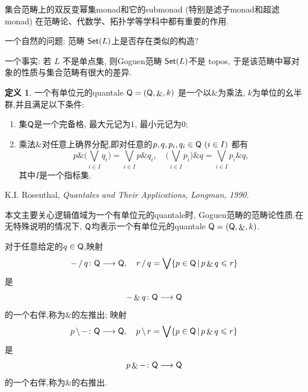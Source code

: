 \documentclass[UTF8]{beamer}
\theoremstyle{definition}
\theoremstyle{definition}
\newtheorem{defn}[thm]{定义}
\DeclareMathOperator{\ldd}{/}
\DeclareMathOperator{\rdd}{\backslash}
\DeclareMathOperator{\with}{\&}
\DeclareMathOperator{\ver}{|}
\newcommand{\sQ}{{\sf Q}}
\numberwithin{equation}{section}
\begin{document}

\begin{frame}


集合范畴上的双反变幂集monad和它的submonad (特别是滤子monad和超滤monad) 在范畴论、代数学、拓扑学等学科中都有重要的作用. 

一个自然的问题:
范畴 ${\sf Set}(L)$上是否存在类似的构造?

\vskip 7pt


一个事实: 若 $L$ 不是单点集, 则Goguen范畴 ${\sf Set}(L)$不是 topos, 于是该范畴中幂对象的性质与集合范畴有很大的差异.
\end{frame}	

\begin{frame}
\begin{defn}
一个有单位元的quantale $\sQ=(\sQ,\with,k)$ 是一个以$\with$为乘法, $k$为单位的幺半群,并且满足以下条件:\begin{enumerate}[label={\rm(\roman*)}] \setlength{\itemsep}{0pt}
\item 集$\sQ$是一个完备格, 最大元记为$1$, 最小元记为$0$; 
\item 乘法$\with$对任意上确界分配,即对任意的$p,q,p_{i},q_{i}\in \sQ~(i\in I)$ 都有 		$$p\with\big(\bigvee\limits_{i\in I}q_{i}\big)=\bigvee\limits_{i\in I}p\with q_{i},\quad \big(\bigvee\limits_{i\in I}p_{i}\big)\with q=\bigvee\limits_{i\in I}p_{i}\with q,$$ 	其中$I$是一个指标集. \end{enumerate}
\end{defn}
{\footnotesize
K.I. Rosenthal, \itshape{Quantales and Their Applications}, \upshape Longman,   1990.}
\end{frame}

\begin{frame}
本文主要关心逻辑值域为一个有单位元的quantale时, Goguen范畴的范畴论性质.在无特殊说明的情况下, $\sQ$均表示一个有单位元的quantale $\sQ=(\sQ,\with,k)$.
\end{frame}

\begin{frame}
对于任意给定的$q\in \sQ$,映射$$-\ldd q\colon\sQ\longrightarrow \sQ,\quad r\ldd q=\bigvee\{p\in \sQ\ver p\with q\leqslant r\}$$是$$-\with q\colon\sQ\longrightarrow \sQ$$的一个右伴,称为$\with$的左推出; 映射$$p\rdd -\colon\sQ\longrightarrow \sQ,\quad p\rdd r=\bigvee\{p\in \sQ\ver p\with q\leqslant r\}$$是$$p\with-\colon\sQ\longrightarrow \sQ$$的一个右伴,称为$\with$的右推出. 
\end{frame}	
\end{document}
